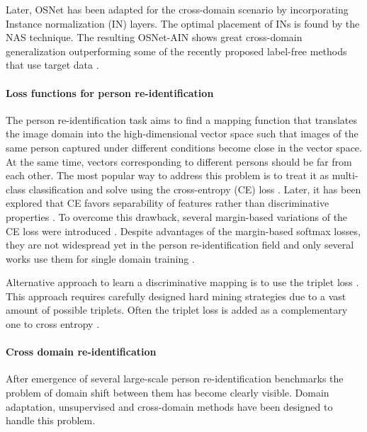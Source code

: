 \documentclass[a4paper,conference]{IEEEtran}
\begin{document}
Later, OSNet has been adapted for the cross-domain
scenario \cite{zhou2019learning} by incorporating Instance normalization \cite{instance} (IN)
layers. The optimal placement of INs is found by the NAS
\cite{Dong2019SearchingFA} technique. The resulting OSNet-AIN shows great
cross-domain generalization outperforming some of the recently proposed
label-free methods that use target data \cite{Yu2019UnsupervisedPR,
  Yang2019PatchBasedDF}.

\paragraph{Loss functions for person re-identification}

The person re-identification task aims to find a mapping function that
translates the image domain into the high-dimensional vector space
 such that images of the same person captured under
different conditions become close in the vector space. At the same time, vectors
corresponding to different persons should be far from each other.  The most
popular way to address this problem is to treat it as multi-class classification
and solve using the cross-entropy (CE) loss
\cite{zheng2016person,Xiao2016LearningDF}.  Later, it has been explored that CE
favors separability of features rather than discriminative properties
\cite{lmSoftmax, centerLoss}. To overcome this drawback,
several margin-based variations of the CE loss were introduced
\cite{amSoftmax,deng2018arcface}.  Despite advantages of the margin-based
softmax losses, they are not widespread yet in the person re-identification
field and only several works use them for single domain training \cite{SphereReID,
  izutov2018fast, Luo2018SpectralFT}.

Alternative approach to learn a discriminative mapping is to use the triplet
loss \cite{inDefenceTriplet1, inDefenceTriplet2}.  This approach requires
carefully designed hard mining strategies due to a vast amount of possible
triplets. Often the triplet loss is added as a complementary one to cross entropy
\cite{mgn,Luo2019BagOT,abd}.

\paragraph{Cross domain re-identification}

After emergence of several large-scale person re-identification benchmarks
\cite{market, duke2, MSMT17} the problem of domain shift between them has become
clearly visible.  Domain adaptation, unsupervised and cross-domain methods have
been designed to handle this problem.
\end{document}
